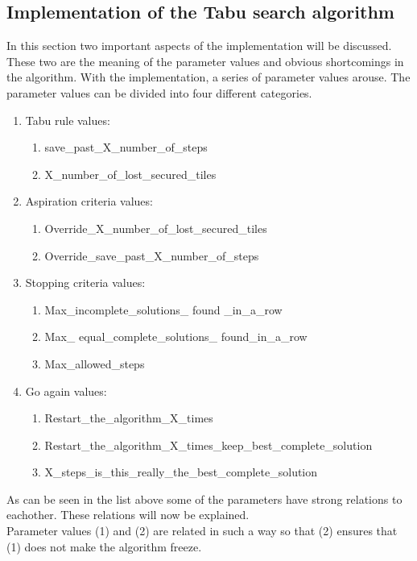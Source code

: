 \subsection{Implementation of the Tabu search algorithm}
In this section two important aspects of the implementation will be discussed. These two are the meaning of the parameter values and obvious shortcomings in the algorithm. With the implementation, a series of parameter values arouse. The parameter values can be divided into four different categories.
\begin{enumerate}
\item{} Tabu rule values:
\begin{enumerate}
\item{} save\_past\_X\_number\_of\_steps
\item{} X\_number\_of\_lost\_secured\_tiles
\end{enumerate} 
\item{} Aspiration criteria values:
\begin{enumerate}
\item{} Override\_X\_number\_of\_lost\_secured\_tiles
\item{} Override\_save\_past\_X\_number\_of\_steps
\end{enumerate} 
\item{} Stopping criteria values:
\begin{enumerate}
\item{} Max\_incomplete\_solutions\_ found \_in\_a\_row
\item{} Max\_ equal\_complete\_solutions\_ found\_in\_a\_row
\item{} Max\_allowed\_steps
\end{enumerate} 
\item{} Go again values:
\begin{enumerate}
\item{} Restart\_the\_algorithm\_X\_times
\item{} Restart\_the\_algorithm\_X\_times\_keep\_best\_complete\_solution
\item{} X\_steps\_is\_this\_really\_the\_best\_complete\_solution
\end{enumerate} 
\end{enumerate} 
As can be seen in the list above some of the parameters have strong relations to eachother. These relations will now be explained. \\
Parameter values (1) and (2) are related in such a way so that (2) ensures that (1) does not make the algorithm freeze. \\

